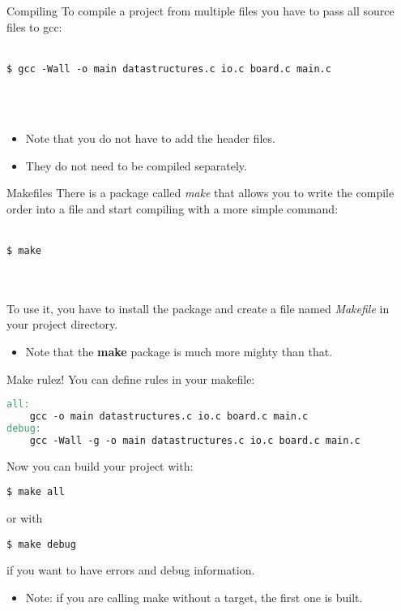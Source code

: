 \subsection{}
\begin{frame}[fragile = singleslide]{Compiling}
	To compile a project from multiple files you have to pass all source files to gcc:\\\ \\
	\begin{lstlisting}[numbers=none]
$ gcc -Wall -o main datastructures.c io.c board.c main.c
\end{lstlisting}\ \\\ \\
	\begin{itemize}
		\item Note that you do not have to add the header files.
		\item They do not need to be compiled separately.
	\end{itemize}
\end{frame}

\begin{frame}[fragile = singleslide]{Makefiles}
	There is a package called \textit{make} that allows you to write the compile order into a file and start compiling with a more simple command:\\\ \\
	\begin{lstlisting}[numbers=none]
$ make
\end{lstlisting}\ \\\ \\
	To use it, you have to install the package and create a file named \textit{Makefile} in your project directory.\\
	\begin{itemize}
		\item Note that the \textbf{make} package is much more mighty than that.
	\end{itemize}
\end{frame}

\begin{frame}[fragile = singleslide]{Make rulez!}
	You can define rules in your makefile:
	\begin{lstlisting}[language=make,basicstyle=\scriptsize,numbers=none]
all:
	gcc -o main datastructures.c io.c board.c main.c
debug:
	gcc -Wall -g -o main datastructures.c io.c board.c main.c
\end{lstlisting}
	Now you can build your project with:
	\begin{lstlisting}[basicstyle=\scriptsize,numbers=none]
$ make all
\end{lstlisting}
	or with
	\begin{lstlisting}[basicstyle=\scriptsize,numbers=none]
$ make debug
\end{lstlisting}
	if you want to have errors and debug information.
	\begin{itemize}
		\item Note: if you are calling make without a target, the first one is built.
	\end{itemize}
\end{frame}

